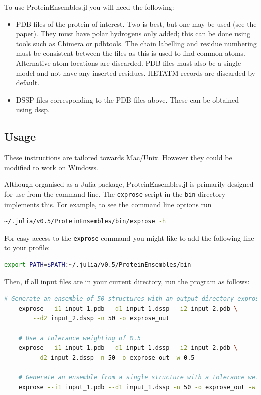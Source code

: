 To use ProteinEnsembles.jl you will need the following:
\begin{itemize}
\item PDB files of the protein of interest. Two is best, but one may be used (see the paper). They must have polar hydrogens only added; this can be done using tools such as Chimera or pdbtools. The chain labelling and residue numbering must be consistent between the files as this is used to find common atoms. Alternative atom locations are discarded. PDB files must also be a single model and not have any inserted residues. HETATM records are discarded by default.
\item DSSP files corresponding to the PDB files above. These can be obtained using dssp.
\end{itemize}


\subsection{Usage}

These instructions are tailored towards Mac/Unix. However they could be modified to work on Windows.

Although organised as a Julia package, ProteinEnsembles.jl is primarily designed for use from the command line. The \verb|exprose| script in the \verb|bin| directory implements this. For example, to see the command line options run

\begin{lstlisting}[language=bash]
    ~/.julia/v0.5/ProteinEnsembles/bin/exprose -h
\end{lstlisting}

For easy access to the \verb|exprose| command you might like to add the following line to your profile:

\begin{lstlisting}[language=bash]
    export PATH=$PATH:~/.julia/v0.5/ProteinEnsembles/bin
\end{lstlisting}

Then, if all input files are in your current directory, run the program as follows:

\begin{lstlisting}[language=bash]
    # Generate an ensemble of 50 structures with an output directory exprose_out
    exprose --i1 input_1.pdb --d1 input_1.dssp --i2 input_2.pdb \
        --d2 input_2.dssp -n 50 -o exprose_out

    # Use a tolerance weighting of 0.5
    exprose --i1 input_1.pdb --d1 input_1.dssp --i2 input_2.pdb \
        --d2 input_2.dssp -n 50 -o exprose_out -w 0.5

    # Generate an ensemble from a single structure with a tolerance weighting of 1.0
    exprose --i1 input_1.pdb --d1 input_1.dssp -n 50 -o exprose_out -w 1.0
\end{lstlisting}

